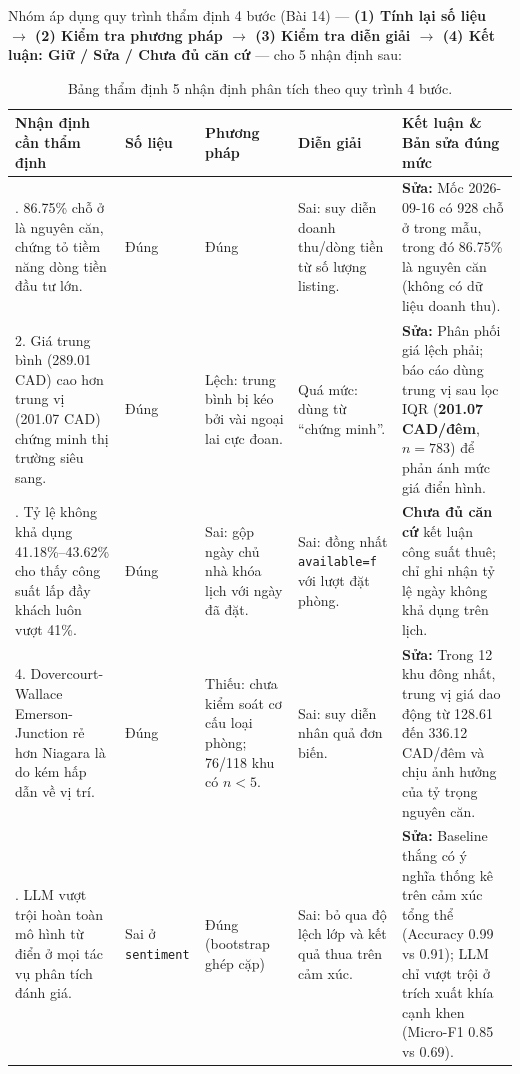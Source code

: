 \documentclass[11pt,a4paper]{article}
\begin{document}
Nhóm áp dụng quy trình thẩm định 4 bước (Bài 14) --- \textbf{(1) Tính lại số liệu $\rightarrow$ (2) Kiểm tra phương pháp $\rightarrow$ (3) Kiểm tra diễn giải $\rightarrow$ (4) Kết luận: Giữ / Sửa / Chưa đủ căn cứ} --- cho 5 nhận định sau:

\begin{table}[H]
  \centering
  \footnotesize
  \renewcommand{\arraystretch}{1.28}
  \begin{tabularx}{\textwidth}{>{\raggedright\arraybackslash}p{3.6cm} l >{\raggedright\arraybackslash}p{2.3cm} >{\raggedright\arraybackslash}p{2.6cm} >{\raggedright\arraybackslash}X}
    \toprule
    \rowcolor{NavyDark}
    \color{white}\textbf{Nhận định cần thẩm định} &
    \color{white}\textbf{Số liệu} &
    \color{white}\textbf{Phương pháp} &
    \color{white}\textbf{Diễn giải} &
    \color{white}\textbf{Kết luận \& Bản sửa đúng mức} \\
    \midrule
    1. 86.75\% chỗ ở là nguyên căn, chứng tỏ tiềm năng dòng tiền đầu tư lớn. &
    Đúng & Đúng &
    Sai: suy diễn doanh thu/dòng tiền từ số lượng listing. &
    \textbf{Sửa:} Mốc 2026-09-16 có 928 chỗ ở trong mẫu, trong đó 86.75\% là nguyên căn (không có dữ liệu doanh thu). \\
    \rowcolor{LightBg}
    2. Giá trung bình (289.01 CAD) cao hơn trung vị (201.07 CAD) chứng minh thị trường siêu sang. &
    Đúng &
    Lệch: trung bình bị kéo bởi vài ngoại lai cực đoan. &
    Quá mức: dùng từ ``chứng minh''. &
    \textbf{Sửa:} Phân phối giá lệch phải; báo cáo dùng trung vị sau lọc IQR (\textbf{201.07 CAD/đêm}, $n = 783$) để phản ánh mức giá điển hình. \\
    3. Tỷ lệ không khả dụng 41.18\%--43.62\% cho thấy công suất lấp đầy khách luôn vượt 41\%. &
    Đúng &
    Sai: gộp ngày chủ nhà khóa lịch với ngày đã đặt. &
    Sai: đồng nhất \texttt{available=f} với lượt đặt phòng. &
    \textbf{Chưa đủ căn cứ} kết luận công suất thuê; chỉ ghi nhận tỷ lệ ngày không khả dụng trên lịch. \\
    \rowcolor{LightBg}
    4. Dovercourt-Wallace Emerson-Junction rẻ hơn Niagara là do kém hấp dẫn về vị trí. &
    Đúng &
    Thiếu: chưa kiểm soát cơ cấu loại phòng; 76/118 khu có $n < 5$. &
    Sai: suy diễn nhân quả đơn biến. &
    \textbf{Sửa:} Trong 12 khu đông nhất, trung vị giá dao động từ 128.61 đến 336.12 CAD/đêm và chịu ảnh hưởng của tỷ trọng nguyên căn. \\
    5. LLM vượt trội hoàn toàn mô hình từ điển ở mọi tác vụ phân tích đánh giá. &
    Sai ở \texttt{sentiment} &
    Đúng (bootstrap ghép cặp) &
    Sai: bỏ qua độ lệch lớp và kết quả thua trên cảm xúc. &
    \textbf{Sửa:} Baseline thắng có ý nghĩa thống kê trên cảm xúc tổng thể (Accuracy 0.99 vs 0.91); LLM chỉ vượt trội ở trích xuất khía cạnh khen (Micro-F1 0.85 vs 0.69). \\
    \bottomrule
  \end{tabularx}
  \caption{\small Bảng thẩm định 5 nhận định phân tích theo quy trình 4 bước.}
\end{table}
\end{document}
